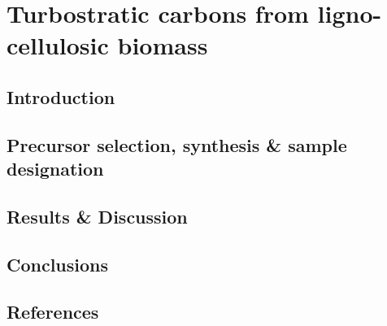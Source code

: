 \chapter{Turbostratic carbons from ligno-cellulosic biomass}
\label{ch:syntheses}

\newpage

\section{Introduction}

\section{Precursor selection, synthesis \& sample designation}

\section{Results \& Discussion}






\section{Conclusions}

\section*{References}